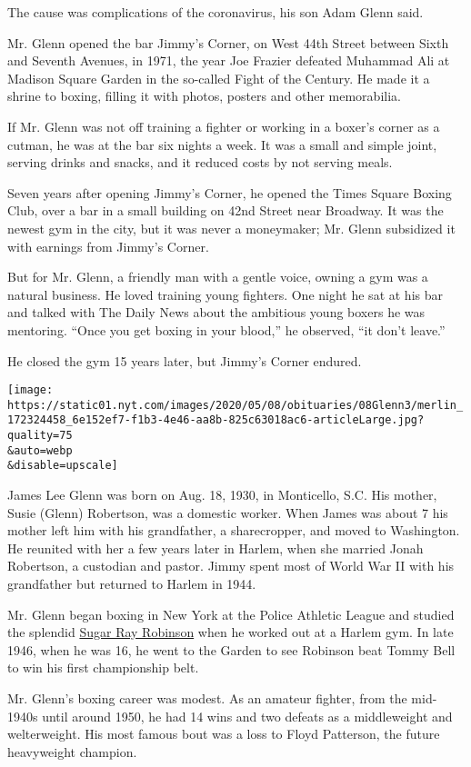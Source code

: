 The cause was complications of the coronavirus, his son Adam Glenn said.

Mr. Glenn opened the bar Jimmy's Corner, on West 44th Street between
Sixth and Seventh Avenues, in 1971, the year Joe Frazier defeated
Muhammad Ali at Madison Square Garden in the so-called Fight of the
Century. He made it a shrine to boxing, filling it with photos, posters
and other memorabilia.

If Mr. Glenn was not off training a fighter or working in a boxer's
corner as a cutman, he was at the bar six nights a week. It was a small
and simple joint, serving drinks and snacks, and it reduced costs by not
serving meals.

Seven years after opening Jimmy's Corner, he opened the Times Square
Boxing Club, over a bar in a small building on 42nd Street near
Broadway. It was the newest gym in the city, but it was never a
moneymaker; Mr. Glenn subsidized it with earnings from Jimmy's Corner.

But for Mr. Glenn, a friendly man with a gentle voice, owning a gym was
a natural business. He loved training young fighters. One night he sat
at his bar and talked with The Daily News about the ambitious young
boxers he was mentoring. ``Once you get boxing in your blood,'' he
observed, ``it don't leave.''

He closed the gym 15 years later, but Jimmy's Corner endured.

\texttt{[image: https://static01.nyt.com/images/2020/05/08/obituaries/08Glenn3/merlin\_172324458\_6e152ef7-f1b3-4e46-aa8b-825c63018ac6-articleLarge.jpg?quality=75\\\&auto=webp\\\&disable=upscale]}

James Lee Glenn was born on Aug. 18, 1930, in Monticello, S.C. His
mother, Susie (Glenn) Robertson, was a domestic worker. When James was
about 7 his mother left him with his grandfather, a sharecropper, and
moved to Washington. He reunited with her a few years later in Harlem,
when she married Jonah Robertson, a custodian and pastor. Jimmy spent
most of World War II with his grandfather but returned to Harlem in
1944.

Mr. Glenn began boxing in New York at the Police Athletic League and
studied the splendid
\href{https://www.nytimes.com/1989/04/13/obituaries/sugar-ray-robinson-boxing-s-best-is-dead.html}{Sugar
Ray Robinson} when he worked out at a Harlem gym. In late 1946, when he
was 16, he went to the Garden to see Robinson beat Tommy Bell to win his
first championship belt.

Mr. Glenn's boxing career was modest. As an amateur fighter, from the
mid-1940s until around 1950, he had 14 wins and two defeats as a
middleweight and welterweight. His most famous bout was a loss to Floyd
Patterson, the future heavyweight champion.

